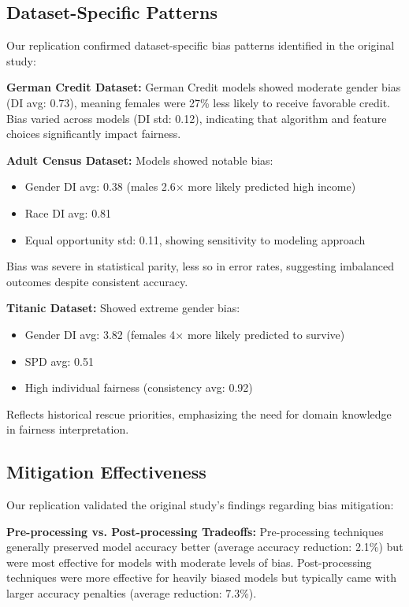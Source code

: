 \documentclass[10pt,journal,compsoc]{IEEEtran}
\begin{document}
\subsection{Dataset-Specific Patterns}
Our replication confirmed dataset-specific bias patterns identified in the original study:

\textbf{German Credit Dataset:} German Credit models showed moderate gender bias (DI avg: 0.73), meaning females were 27\% less likely to receive favorable credit. Bias varied across models (DI std: 0.12), indicating that algorithm and feature choices significantly impact fairness.

\textbf{Adult Census Dataset:} Models showed notable bias:
\begin{itemize}
\item Gender DI avg: 0.38 (males 2.6× more likely predicted high income)
\item Race DI avg: 0.81
\item Equal opportunity std: 0.11, showing sensitivity to modeling approach
\end{itemize}
Bias was severe in statistical parity, less so in error rates, suggesting imbalanced outcomes despite consistent accuracy.

\textbf{Titanic Dataset:} Showed extreme gender bias:
\begin{itemize}
\item Gender DI avg: 3.82 (females 4× more likely predicted to survive)
\item SPD avg: 0.51
\item High individual fairness (consistency avg: 0.92)
\end{itemize}
Reflects historical rescue priorities, emphasizing the need for domain knowledge in fairness interpretation.

\subsection{Mitigation Effectiveness}
Our replication validated the original study's findings regarding bias mitigation:

\textbf{Pre-processing vs. Post-processing Tradeoffs:} Pre-processing techniques generally preserved model accuracy better (average accuracy reduction: 2.1\%) but were most effective for models with moderate levels of bias. Post-processing techniques were more effective for heavily biased models but typically came with larger accuracy penalties (average reduction: 7.3\%).
\end{document}
